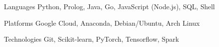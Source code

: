 \begin{cvskills}

\cvskill
    {Languages}
    {Python, Prolog, Java, Go, JavaScript (Node.js), SQL, Shell}

\cvskill
    {Platforms}
    {Google Cloud, Anaconda, Debian/Ubuntu, Arch Linux}

\cvskill
    {Technologies}
    {Git, Scikit-learn, PyTorch, Tensorflow, Spark}

\end{cvskills}
